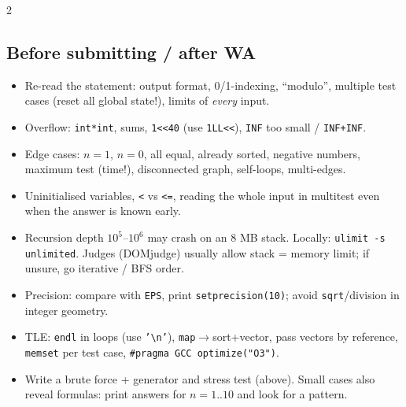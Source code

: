 \documentclass[8pt,a4paper]{extarticle}
\begin{document}
\begin{multicols*}{2}
\subsection{Before submitting / after WA}
\begin{itemize}
\item Re-read the statement: output format, 0/1-indexing, ``modulo'',
  multiple test cases (reset all global state!), limits of \emph{every} input.
\item Overflow: \texttt{int*int}, sums, \texttt{1<<40} (use \texttt{1LL<<}),
  \texttt{INF} too small / \texttt{INF+INF}.
\item Edge cases: $n=1$, $n=0$, all equal, already sorted, negative numbers,
  maximum test (time!), disconnected graph, self-loops, multi-edges.
\item Uninitialised variables, \texttt{<} vs \texttt{<=}, reading the whole
  input in multitest even when the answer is known early.
\item Recursion depth $10^5$--$10^6$ may crash on an 8 MB stack. Locally: \texttt{ulimit -s unlimited}. Judges (DOMjudge) usually allow stack = memory limit; if unsure, go iterative / BFS order.
\item Precision: compare with \texttt{EPS}, print \texttt{setprecision(10)};
  avoid \texttt{sqrt}/division in integer geometry.
\item TLE: \texttt{endl} in loops (use \texttt{'\textbackslash n'}),
  \texttt{map}$\to$sort+vector, pass vectors by reference,
  \texttt{memset} per test case, \texttt{\#pragma GCC optimize("O3")}.
\item Write a brute force + generator and stress test (above).
  Small cases also reveal formulas: print answers for $n=1..10$ and look
  for a pattern.
\end{itemize}


\end{multicols*}
\end{document}
